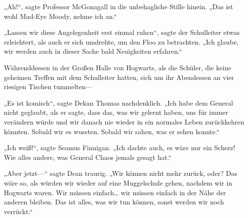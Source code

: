 „Ah!“, sagte Professor McGonagall in die unbehagliche Stille hinein. „Das ist wohl Mad-Eye Moody, nehme ich an.“

„Lassen wir diese Angelegenheit erst einmal ruhen“, sagte der Schulleiter etwas erleichtert, als auch er sich umdrehte, um den Floo zu betrachten. „Ich glaube, wir werden auch in dieser Sache bald Neuigkeiten erfahren.“


Währenddessen in der Großen Halle von Hogwarts, als die Schüler, die keine geheimen Treffen mit dem Schulleiter hatten, sich um ihr Abendessen an vier riesigen Tischen tummelten—

„Es ist komisch“, sagte Dekan Thomas nachdenklich. „Ich habe dem General nicht geglaubt, als er sagte, dass das, was wir gelernt haben, uns für immer verändern würde und wir danach nie wieder in ein normales Leben zurückkehren könnten. Sobald wir es wussten. Sobald wir sahen, was er sehen konnte.“

„Ich weiß!“, sagte Seamus Finnigan. „Ich dachte auch, es wäre nur ein Scherz! Wie alles andere, was General Chaos jemals gesagt hat.“

„Aber jetzt—“ sagte Dean traurig. „Wir können nicht mehr zurück, oder? Das wäre so, als würden wir wieder auf eine Muggelschule gehen, nachdem wir in Hogwarts waren. Wir müssen einfach… wir müssen einfach in der Nähe der anderen bleiben. Das ist alles, was wir tun können, sonst werden wir noch verrückt.“

